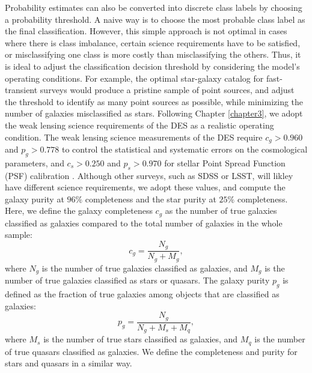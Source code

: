 Probability estimates can also be converted into discrete class labels by choosing a probability threshold.
A naive way is to choose the most probable class label as the final classification.
However, this simple approach is not optimal in cases where there is class imbalance,
certain science requirements have to be satisfied, or misclassifying one class is more costly than misclassifying the others.
Thus, it is ideal to adjust the classification decision threshold by considering the model's operating conditions.
For example, the optimal star-galaxy catalog for fast-transient surveys would produce a pristine sample of point sources, and
\citet{miller2017preparing} adjust the threshold to identify as many point sources as possible, while minimizing the number
of galaxies misclassified as stars.
Following Chapter \ref{chapter3}, we adopt the weak lensing science requirements of the DES
as a realistic operating condition.
The weak lensing science measurements of the DES require $c_g > 0.960$ and $p_g > 0.778$ to control the statistical and systematic errors
on the cosmological parameters, and $c_s > 0.250$ and $p_s > 0.970$ for stellar Point Spread Function (PSF) calibration
\citep{soumagnac2015star}.
Although other surveys, such as SDSS or LSST, will likley have different science requirements,
we adopt these values,
and compute the galaxy purity at $96\%$ completeness and the star purity at $25\%$ completeness.
Here, we define the galaxy completeness $c_g$ as the number of true galaxies classified as galaxies
compared to the total number of galaxies in the whole sample:
\begin{equation}
c_g = \frac{ N_g }{ N_g + M_g },
\end{equation}
where $N_g$ is the number of true galaxies classified as galaxies, and
$M_g$ is the number of true galaxies classified as stars or quasars.
The galaxy purity $p_g$ is defined as the fraction of true galaxies among objects that are classified as galaxies:
\begin{equation}
p_g = \frac{ N_g }{ N_g + M_s + M_q },
\end{equation}
where $M_s$ is the number of true stars classified as galaxies,
and $M_q$ is the number of true quasars classified as galaxies.
We define the completeness and purity for stars and quasars in a similar way.


